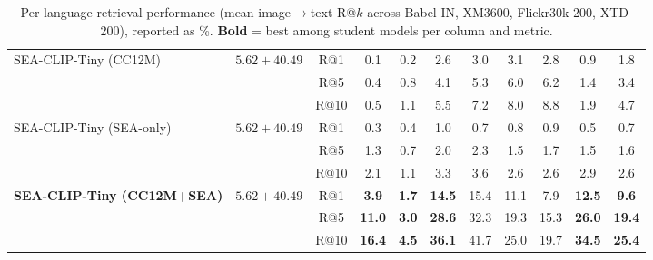 \documentclass[11pt]{article}
\begin{document}
\begin{table}[h!]
{\begin{tabular}{l c c ccccccc c}
\multirow{3}{*}{SEA-CLIP-Tiny (CC12M)}
  & \multirow{3}{*}{$5.62 + 40.49$}
  & R@1  &  0.1 &  0.2 &  2.6 &  3.0 &  3.1 &  2.8 &  0.9 &  1.8 \\
& & R@5  &  0.4 &  0.8 &  4.1 &  5.3 &  6.0 &  6.2 &  1.4 &  3.4 \\
& & R@10 &  0.5 &  1.1 &  5.5 &  7.2 &  8.0 &  8.8 &  1.9 &  4.7 \\
\midrule
\multirow{3}{*}{SEA-CLIP-Tiny (SEA-only)}
  & \multirow{3}{*}{$5.62 + 40.49$}
  & R@1  &  0.3 &  0.4 &  1.0 &  0.7 &  0.8 &  0.9 &  0.5 &  0.7 \\
& & R@5  &  1.3 &  0.7 &  2.0 &  2.3 &  1.5 &  1.7 &  1.5 &  1.6 \\
& & R@10 &  2.1 &  1.1 &  3.3 &  3.6 &  2.6 &  2.6 &  2.9 &  2.6 \\
\midrule
\multirow{3}{*}{\textbf{SEA-CLIP-Tiny (CC12M+SEA)}}
  & \multirow{3}{*}{$5.62 + 40.49$}
  & R@1  & \textbf{3.9} & \textbf{1.7} & \textbf{14.5} & {15.4} & {11.1} & {7.9} & \textbf{12.5} & \textbf{9.6} \\
& & R@5  & \textbf{11.0} & \textbf{3.0} & \textbf{28.6} & {32.3} & {19.3} & {15.3} & \textbf{26.0} & \textbf{19.4} \\
& & R@10 & \textbf{16.4} & \textbf{4.5} & \textbf{36.1} & {41.7} & {25.0} & {19.7} & \textbf{34.5} & \textbf{25.4} \\
\bottomrule
\end{tabular}%
}
\caption{Per-language retrieval performance (mean image$\to$text R@$k$ across
  Babel-IN, XM3600, Flickr30k-200, XTD-200), reported as \%.
  \textbf{Bold} = best among student models per column and metric.}
\label{tab:per_language_rk}
\end{table}

\bigskip

\end{document}
